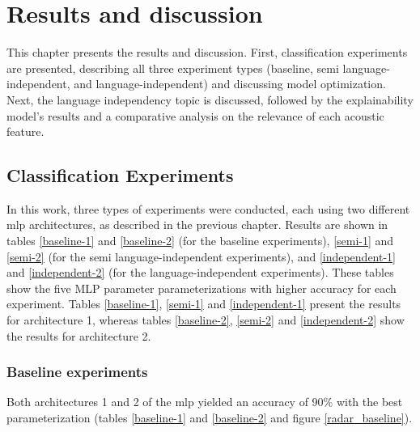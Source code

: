 
\chapter{Results and discussion}
\label{ch:omnisvoluptas}



This chapter presents the results and discussion. First, classification experiments are presented, describing all three experiment types (baseline, semi language-independent, and language-independent) and discussing model optimization. Next, the language independency topic is discussed, followed by the explainability model's results and a comparative analysis on the relevance of each acoustic feature.


\section{Classification Experiments}

In this work, three types of experiments were conducted, each using two different \gls{mlp} architectures, as described in the previous chapter. Results are shown in tables \ref{baseline-1} and \ref{baseline-2} (for the baseline experiments), \ref{semi-1} and \ref{semi-2} (for the semi language-independent experiments), and \ref{independent-1} and \ref{independent-2} (for the language-independent experiments). These tables show the five MLP parameter parameterizations with higher accuracy for each experiment. Tables \ref{baseline-1}, \ref{semi-1} and \ref{independent-1} present the results for architecture 1, whereas tables \ref{baseline-2}, \ref{semi-2} and \ref{independent-2} show the results for architecture 2.

\subsection{Baseline experiments}

Both architectures 1 and 2 of the \gls{mlp} yielded an accuracy of 90\% with the best parameterization (tables \ref{baseline-1} and \ref{baseline-2} and figure \ref{radar_baseline}).

